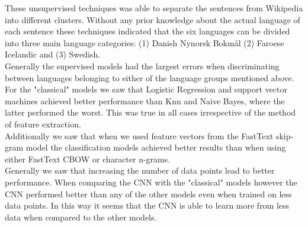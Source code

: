 These unsupervised techniques was able to separate the sentences from Wikipedia into different clusters.
Without any prior knowledge about the actual language of each sentence these techniques indicated that the six languages can be divided into three main language categories: (1) Danish Nynorsk Bokmål (2) Faroese Icelandic and (3) Swedish.\\


Generally the supervised models had the largest errors when discriminating between languages belonging to either of the language groups mentioned above.\\

For the "classical" models we saw that Logistic Regression and support vector machines achieved better performance than Knn and Naive Bayes, where the latter performed the worst. This was true in all cases irrespective of the method of feature extraction.\\

Additionally we saw that when we used feature vectors from the FastText skip-gram model the classification models achieved better results than when using either FastText CBOW or character n-grams.\\

Generally we saw that increasing the number of data points lead to better performance. When comparing the CNN with the "classical" models however the CNN performed better than any of the other models even when trained on less data points. In this way it seems that the CNN is able to learn more from less data when compared to the other models.\\
